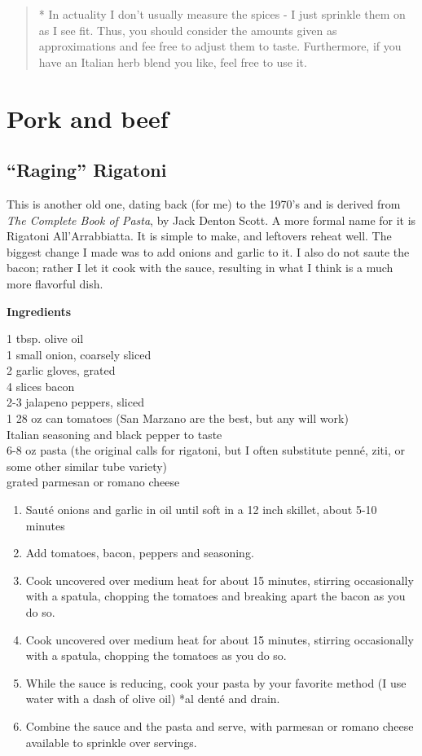\documentclass[
]{book}
\providecommand{\tightlist}{%
  \setlength{\itemsep}{0pt}\setlength{\parskip}{0pt}}
\begin{document}
\begin{quote}
* In actuality I don't usually measure the spices - I just sprinkle them on as I see fit. Thus, you should consider the amounts given as approximations and fee free to adjust them to taste. Furthermore, if you have an Italian herb blend you like, feel free to use it.
\end{quote}

\hypertarget{comeat}{%
\section{Pork and beef}\label{comeat}}

\hypertarget{raging-rigatoni}{%
\subsection{``Raging'' Rigatoni}\label{raging-rigatoni}}

This is another old one, dating back (for me) to the 1970's and is derived from \emph{The Complete Book of Pasta}, by Jack Denton Scott. A more formal name for it is Rigatoni All'Arrabbiatta. It is simple to make, and leftovers reheat well. The biggest change I made was to add onions and garlic to it. I also do not saute the bacon; rather I let it cook with the sauce, resulting in what I think is a much more flavorful dish.

\textbf{Ingredients}

1 tbsp. olive oil\\
1 small onion, coarsely sliced\\
2 garlic gloves, grated\\
4 slices bacon\\
2-3 jalapeno peppers, sliced\\
1 28 oz can tomatoes (San Marzano are the best, but any will work)\\
Italian seasoning and black pepper to taste\\
6-8 oz pasta (the original calls for rigatoni, but I often substitute penné, ziti, or some other similar tube variety)\\
grated parmesan or romano cheese

\begin{enumerate}
\def\labelenumi{\arabic{enumi}.}
\tightlist
\item
  Sauté onions and garlic in oil until soft in a 12 inch skillet, about 5-10 minutes
\item
  Add tomatoes, bacon, peppers and seasoning.
\item
  Cook uncovered over medium heat for about 15 minutes, stirring occasionally with a spatula, chopping the tomatoes and breaking apart the bacon as you do so.
\item
  Cook uncovered over medium heat for about 15 minutes, stirring occasionally with a spatula, chopping the tomatoes as you do so.
\item
  While the sauce is reducing, cook your pasta by your favorite method (I use water with a dash of olive oil) *al denté and drain.
\item
  Combine the sauce and the pasta and serve, with parmesan or romano cheese available to sprinkle over servings.
\end{enumerate}
\end{document}
